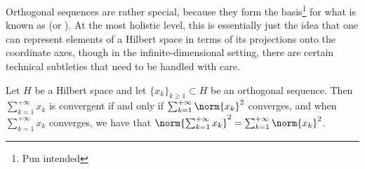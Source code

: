         Orthogonal sequences are rather special, because they form the basis\footnote{Pun intended} for what is known as  (or ). At the most holistic level, this is essentially just the idea that one can represent elements of a Hilbert space in terms of its projections onto the coordinate axes, though in the infinite-dimensional setting, there are certain technical subtleties that need to be handled with care. 
        \begin{lemma} \label{lemma: convergent_orthogonal_series_in_hilbert_spaces}
            Let $H$ be a Hilbert space and let $\{x_k\}_{k \geq 1} \subset H$ be an orthogonal sequence. Then $\sum_{k = 1}^{+\infty} x_k$ is convergent if and only if $\sum_{k = 1}^{+\infty} \norm{x_k}^2$ converges, and when $\sum_{k = 1}^{+\infty} x_k$ converges, we have that $\norm{ \sum_{k = 1}^{+\infty} x_k }^2 = \sum_{k = 1}^{+\infty} \norm{x_k}^2$.
        \end{lemma}
